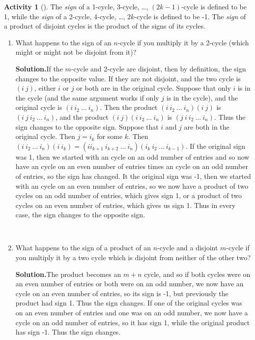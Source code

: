 \documentclass[10pt,]{book}
\theoremstyle{plain}
\theoremstyle{definition}
\newtheorem{activity}[project]{Activity}
\numberwithin{equation}{chapter}
\begin{document}
\begin{activity}[]\label{activity-260}
The \emph{sign} of a 1-cycle, 3-cycle, \dots{}, \((2k-1)\)-cycle is defined to be 1, while the \emph{sign} of a 2-cycle, 4-cycle, \dots{}, \(2k\)-cycle is defined to be -1. The \emph{sign} of a product of disjoint cycles is the product of the signs of its cycles.%
~\par
\begin{enumerate}[label=(\alph*)]
 \item What happens to the sign of an \(n\)-cycle if you multiply it by a 2-cycle (which might or might not be disjoint from it)?%
\par\medskip\noindent%
\textbf{Solution.}\quad If the \(m\)-cycle and 2-cycle are disjoint, then by definition, the sign changes to the opposite value. If they are not disjoint, and the two cycle is \((i\
j)\), either \(i\) or \(j\) or both are in the original cycle. Suppose that only \(i\) is in the cycle (and the same argument works if only \(j\) is in the cycle), and the original cycle is \((i\ i_2\ \ldots\ i_n)\). Then the product \((i\ i_2\
\ldots\ i_n)(i\ j)\) is \((i\ j\ i_2\ \ldots\ i_n)\), and the product \((i\ j)(i\ i_2\ \ldots\ i_n)\) is \((j\ i\
i_2\
\ldots\ i_n)\). Thus the sign changes to the opposite sign. Suppose that \(i\) and \(j\) are both in the original cycle. Then \(j= i_k\) for some \(k\). Then \((i\ i_2\ \ldots\
i_n)(i\ i_k)=(i i_{k+1}\ i_{k+2}\ \ldots\ i_n)(i_k\ i_2\ \ldots\ i_{k-1})\). If the original sign was 1, then we started with an cycle on an odd number of entries and so now have an cycle on an even number of entries times an cycle on an odd number of entries, so the sign has changed. It the original sign was -1, then we started with an cycle on an even number of entries, so we now have a product of two cycles on an odd number of entries, which gives sign 1, or a product of two cycles on an even number of entries, which gives us sign 1. Thus in every case, the sign changes to the opposite sign.%

~\par
\item What happens to the sign of a product of an \(n\)-cycle and a disjoint \(m\)-cycle if you multiply it by a two cycle which is disjoint from neither of the other two?%
\par\medskip\noindent%
\textbf{Solution.}\quad The product becomes an \(m+n\) cycle, and so if both cycles were on an even number of entries or both were on an odd number, we now have an cycle on an even number of entries, so its sign is -1, but previously the product had sign 1. Thus the sign changes. If one of the original cycles was on an even number of entries and one was on an odd number, we now have a cycle on an odd number of entries, so it has sign 1, while the original product has sign -1. Thus the sign changes.%


\end{enumerate}
\end{activity}
\end{document}
